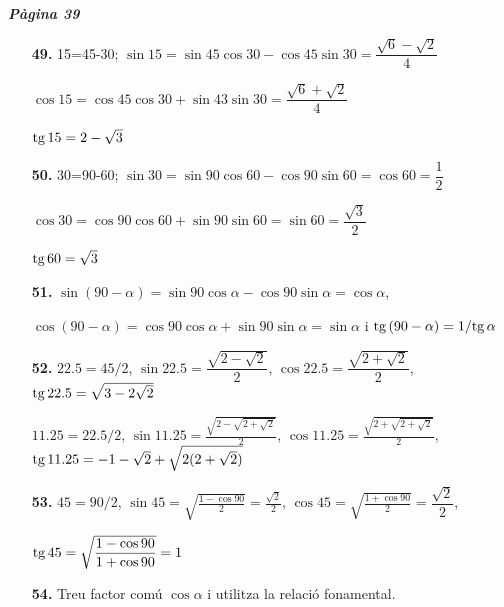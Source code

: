 \documentclass[a4paper, pdf, twoside]{book}
\begin{document}
\begin{multicols}{2}
{\textbf{\em Pàgina 39}} \hrulefill
\begin{enumerate}
\vspace{0.25cm}
\item[\fontfamily{phv}\selectfont\color{blue}\textbf{49. }] 
15=45-30; $\sin 15=\sin 45\cos 30 - \cos 45 \sin 30= \dfrac {\sqrt {6}-\sqrt {2}}{4}$ \par $\cos 15=\cos 45\cos 30 + \sin 43 \sin 30= \dfrac {\sqrt {6}+\sqrt {2}}{4}$ \par $\mathrm{tg}\, 15=2-\sqrt {3}$ 
 \end{enumerate}
\begin{enumerate}
\vspace{0.25cm}
\item[\fontfamily{phv}\selectfont\color{blue}\textbf{50. }] 
30=90-60; $\sin 30=\sin 90\cos 60 - \cos 90 \sin 60= \cos 60 = \dfrac {1}{2}$ \par $\cos 30=\cos 90\cos 60 + \sin 90 \sin 60= \sin 60 =\dfrac {\sqrt {3}}{2}$ \par $\mathrm{tg}\, 60=\sqrt {3}$ 
\vspace{0.25cm}
\item[\fontfamily{phv}\selectfont\color{blue}\textbf{51. }] 
$\sin (90-\alpha )=\sin 90 \cos \alpha - \cos 90 \sin \alpha = \cos \alpha $,\par $\cos (90-\alpha )=\cos 90 \cos \alpha + \sin 90 \sin \alpha =\sin \alpha $ i $\mathrm{tg}\, (90-\alpha )= 1/\mathrm{tg}\, \alpha $
\vspace{0.25cm}
\item[\fontfamily{phv}\selectfont\color{blue}\textbf{52. }] 
$22.5 = 45/2$, $\sin 22.5= \dfrac {\sqrt {2-\sqrt {2}}}{2}$, $\cos 22.5= \dfrac {\sqrt {2+\sqrt {2}}}{2}$, $\mathrm{tg}\, 22.5= \sqrt {3-2\sqrt {2}}$\par $11.25 = 22.5/2$, $\sin 11.25= \frac {\sqrt {2-\sqrt {2+\sqrt {2}}}}{2}$, $\cos 11.25= \frac {\sqrt {2+\sqrt {2+\sqrt {2}}}}{2}$, $\mathrm{tg}\, 11.25= -1-\sqrt {2}+\sqrt {2(2+\sqrt {2})}$ 
\vspace{0.25cm}
\item[\fontfamily{phv}\selectfont\color{blue}\textbf{53. }] 
$45 = 90/2$, $\sin 45= \sqrt {\frac {1-\cos 90}{2}}=\frac {\sqrt {2}}{2}$, $\cos 45= \sqrt {\frac {1+\cos 90}{2}}=\dfrac {\sqrt {2}}{2}$,\par $\mathrm{tg}\, 45= \sqrt {\dfrac {1-\cos 90}{1+\cos 90}}=1$
\vspace{0.25cm}
\item[\fontfamily{phv}\selectfont\color{blue}\textbf{54. }]  \scalebox{0.6}{\simbolcompass } 
Treu factor comú $\cos \alpha $ i utilitza la relació fonamental.

\end{enumerate}
\end{multicols}
\end{document}
